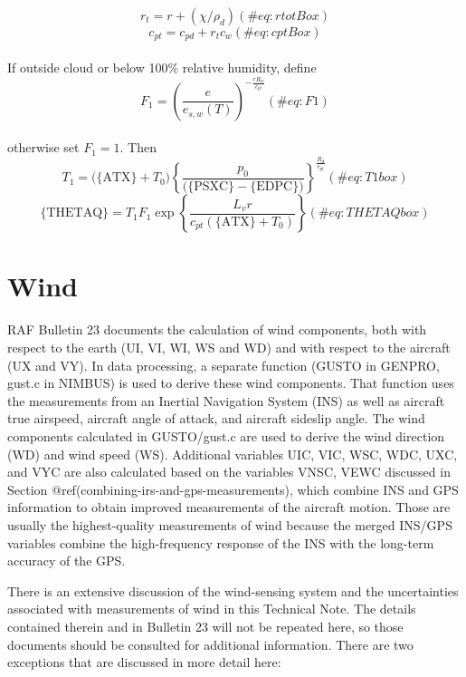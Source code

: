 \documentclass[
  english,
]{book}
\begin{document}
\begin{equation}
r_{t}=r+(\chi/\rho_{d})
(\#eq:rtotBox)
\end{equation} \begin{equation}
c_{pt}=c_{pd}+r_{t}c_{w}
(\#eq:cptBox)
\end{equation}\\
If outside cloud or below 100\% relative humidity, define\\
\begin{equation}
F_{1}=\left(\frac{e}{e_{s,w}(T)}\right)^{-\frac{rR_{w}}{c_{pt}}}
(\#eq:F1)
\end{equation}\\
otherwise set \(F_{1}=1\). Then\\
\begin{equation}
T_{1}=\mathrm{(\{ATX\}}+T_{0})\left\{ \frac{p_{0}}{(\mathrm{\{PSXC\}}-\mathrm{\{EDPC\})}}\right\} ^{\frac{R_{d}}{c_{pt}}}
(\#eq:T1box)
\end{equation} \begin{equation}
\mathrm{\{THETAQ\}}=T_{1}F_{1}\exp\left\{ \frac{L_{v}r}{c_{pt}(\{\mathrm{ATX\}}+T_{0})}\right\}
(\#eq:THETAQbox)
\end{equation}

\hypertarget{wind}{%
\section{Wind}\label{wind}}

RAF Bulletin 23 documents the calculation of wind components, both with
respect to the earth (UI, VI, WI, WS and WD) and with respect to the
aircraft (UX and VY). In data processing, a separate function (GUSTO in
GENPRO, gust.c in NIMBUS) is used to derive these wind components. That
function uses the measurements from an Inertial Navigation System (INS)
as well as aircraft true airspeed, aircraft angle of attack, and
aircraft sideslip angle. The wind components calculated in GUSTO/gust.c
are used to derive the wind direction (WD) and wind speed (WS).
Additional variables UIC, VIC, WSC, WDC, UXC, and VYC are also
calculated based on the variables VNSC, VEWC discussed in Section
@ref(combining-irs-and-gps-measurements), which combine INS and GPS
information to obtain improved measurements of the aircraft motion.
Those are usually the highest-quality measurements of wind because the
merged INS/GPS variables combine the high-frequency response of the INS
with the long-term accuracy of the GPS.

There is an extensive discussion of the wind-sensing system and the
uncertainties associated with measurements of wind in this Technical
Note. The details contained therein and in Bulletin 23 will not be
repeated here, so those documents should be consulted for additional
information. There are two exceptions that are discussed in more detail
here:
\end{document}
